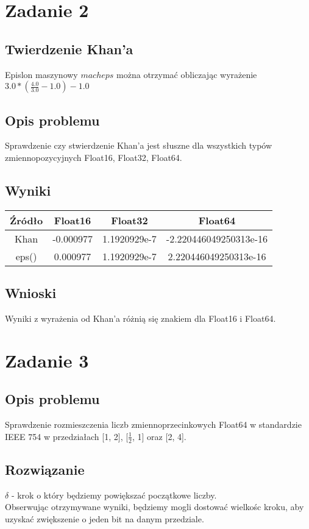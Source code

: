 \documentclass{article}
\begin{document}
\section{Zadanie 2}
\subsection{Twierdzenie Khan'a}
	Epislon maszynowy $macheps$ można otrzymać obliczając wyrażenie $3.0*(\frac{4.0}{3.0} - 1.0) - 1.0$
\subsection{Opis problemu}
    Sprawdzenie czy stwierdzenie Khan'a jest słuszne dla wszystkich typów zmiennopozycyjnych Float16, Float32, Float64.
\subsection{Wyniki}
    \begin{center}
        \begin{tabular}{|c||c|c|c|}
        \hline
            Źródło & Float16 & Float32 & Float64 \\
            \hline\hline
            Khan & -0.000977 & 1.1920929e-7 & -2.220446049250313e-16\\
            \hline
            eps() & 0.000977 & 1.1920929e-7 & 2.220446049250313e-16\\
        \hline
        \end{tabular}
    \end{center}
\subsection{Wnioski}
    Wyniki z wyrażenia od Khan'a różnią się znakiem dla Float16 i Float64.

\section{Zadanie 3}
\subsection{Opis problemu}
	Sprawdzenie rozmieszczenia liczb zmiennoprzecinkowych Float64 w standardzie IEEE 754 w przedziałach [1, 2], [$\frac{1}{2}$, 1] oraz [2, 4].
\subsection{Rozwiązanie}
	$\delta$ - krok o który będziemy powiększać początkowe liczby.\\
    Obserwując otrzymywane wyniki, będziemy mogli dostować wielkośc kroku, aby uzyskać zwiększenie o jeden bit na danym przedziale.
\end{document}

